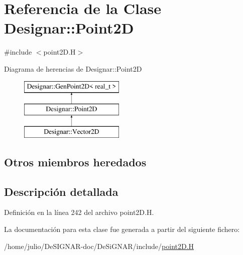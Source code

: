\hypertarget{class_designar_1_1_point2_d}{}\section{Referencia de la Clase Designar\+:\+:Point2D}
\label{class_designar_1_1_point2_d}


{\ttfamily \#include $<$point2\+D.\+H$>$}

Diagrama de herencias de Designar\+:\+:Point2D\begin{figure}[H]
\begin{center}
\leavevmode
\includegraphics[height=3.000000cm]{class_designar_1_1_point2_d}
\end{center}
\end{figure}
\subsection*{Otros miembros heredados}


\subsection{Descripción detallada}


Definición en la línea 242 del archivo point2\+D.\+H.



La documentación para esta clase fue generada a partir del siguiente fichero\+:\begin{DoxyCompactItemize}
\item 
/home/julio/\+De\+S\+I\+G\+N\+A\+R-\/doc/\+De\+Si\+G\+N\+A\+R/include/\hyperlink{point2_d_8_h}{point2\+D.\+H}\end{DoxyCompactItemize}
